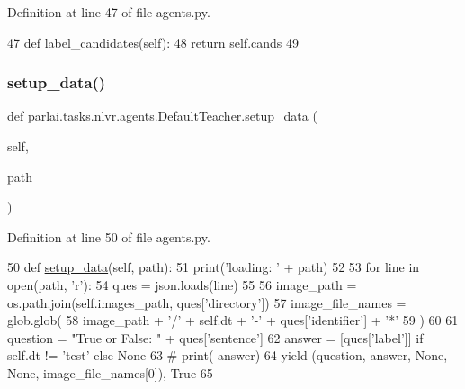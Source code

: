 Definition at line 47 of file agents.\+py.


\begin{DoxyCode}
47     \textcolor{keyword}{def }label\_candidates(self):
48         \textcolor{keywordflow}{return} self.cands
49 
\end{DoxyCode}
\mbox{\label{classparlai_1_1tasks_1_1nlvr_1_1agents_1_1DefaultTeacher_a2c295a40d3167ecbeb5ca97c8670020b}} 
\subsubsection{\texorpdfstring{setup\+\_\+data()}{setup\_data()}}
{\footnotesize\ttfamily def parlai.\+tasks.\+nlvr.\+agents.\+Default\+Teacher.\+setup\+\_\+data (\begin{DoxyParamCaption}\item[{}]{self,  }\item[{}]{path }\end{DoxyParamCaption})}



Definition at line 50 of file agents.\+py.


\begin{DoxyCode}
50     \textcolor{keyword}{def }\hyperlink{namespaceparlai_1_1tasks_1_1multinli_1_1agents_a4fa2cb0ba1ed745336ad8bceed36b841}{setup\_data}(self, path):
51         print(\textcolor{stringliteral}{'loading: '} + path)
52 
53         \textcolor{keywordflow}{for} line \textcolor{keywordflow}{in} open(path, \textcolor{stringliteral}{'r'):}
54 \textcolor{stringliteral}{            ques = json.loads(line)}
55 \textcolor{stringliteral}{}
56 \textcolor{stringliteral}{            image\_path = os.path.join(self.images\_path, ques['directory'}])
57             image\_file\_names = glob.glob(
58                 image\_path + \textcolor{stringliteral}{'/'} + self.dt + \textcolor{stringliteral}{'-'} + ques[\textcolor{stringliteral}{'identifier'}] + \textcolor{stringliteral}{'*'}
59             )
60 
61             question = \textcolor{stringliteral}{"True or False: "} + ques[\textcolor{stringliteral}{'sentence'}]
62             answer = [ques[\textcolor{stringliteral}{'label'}]] \textcolor{keywordflow}{if} self.dt != \textcolor{stringliteral}{'test'} \textcolor{keywordflow}{else} \textcolor{keywordtype}{None}
63             \textcolor{comment}{# print( answer)}
64             \textcolor{keywordflow}{yield} (question, answer, \textcolor{keywordtype}{None}, \textcolor{keywordtype}{None}, image\_file\_names[0]), \textcolor{keyword}{True}
65 \end{DoxyCode}


